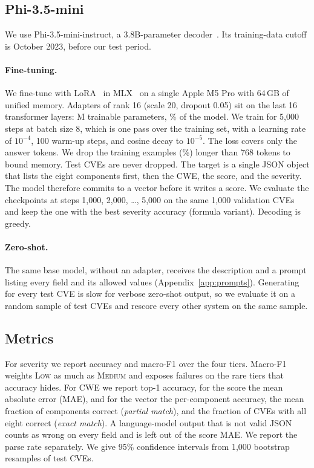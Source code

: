 \subsection{Phi-3.5-mini}
We use Phi-3.5-mini-instruct, a 3.8B-parameter decoder~\citep{abdin2024phi3}.
Its training-data cutoff is October 2023, before our test period.

\paragraph{Fine-tuning.}
We fine-tune with LoRA~\citep{hu2022lora} in MLX~\citep{hannun2023mlx} on a single Apple M5 Pro with 64\,GB of unified memory.
Adapters of rank 16 (scale 20, dropout 0.05) sit on the last 16 transformer layers: \nLoraParams{}M trainable parameters, \nLoraPct\% of the model.
We train for 5,000 steps at batch size 8, which is one pass over the training set, with a learning rate of $10^{-4}$, 100 warm-up steps, and cosine decay to $10^{-5}$.
The loss covers only the answer tokens.
We drop the \nDropped{} training examples (\nDroppedPct\%) longer than 768 tokens to bound memory. Test CVEs are never dropped.
The target is a single JSON object that lists the eight components first, then the CWE, the score, and the severity.
The model therefore commits to a vector before it writes a score.
We evaluate the checkpoints at steps 1,000, 2,000, \ldots, 5,000 on the same 1,000 validation CVEs and keep the one with the best severity accuracy (formula variant).
Decoding is greedy.

\paragraph{Zero-shot.}
The same base model, without an adapter, receives the description and a prompt listing every field and its allowed values (Appendix~\ref{app:prompts}).
Generating for every test CVE is slow for verbose zero-shot output, so we evaluate it on a random sample of \nSub{} test CVEs and rescore every other system on the same sample.

\subsection{Metrics}
For severity we report accuracy and macro-F1 over the four tiers. Macro-F1 weights \textsc{Low} as much as \textsc{Medium} and exposes failures on the rare tiers that accuracy hides.
For CWE we report top-1 accuracy, for the score the mean absolute error (MAE), and for the vector the per-component accuracy, the mean fraction of components correct (\emph{partial match}), and the fraction of CVEs with all eight correct (\emph{exact match}).
A language-model output that is not valid JSON counts as wrong on every field and is left out of the score MAE. We report the parse rate separately.
We give 95\% confidence intervals from 1,000 bootstrap resamples of test CVEs.
